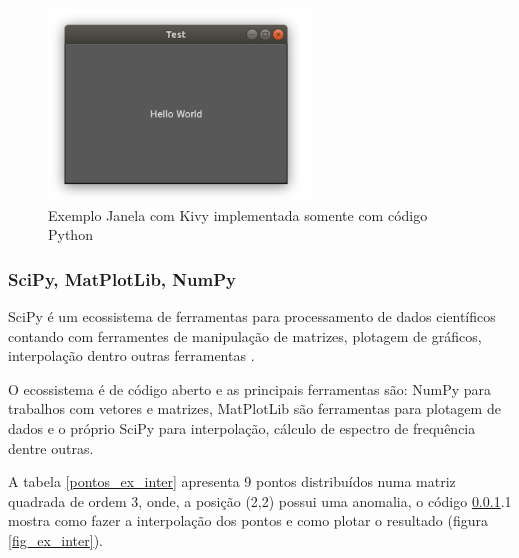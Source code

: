             \begin{figure}[h]
                \caption{Exemplo Janela com Kivy implementada somente com código Python}
                \begin{center}
                    \includegraphics[width=7cm]{texto/fig/hello_world_kivy.png} 
                \end{center}
                \label{janela_kivy} 
            \end{figure}


            
            \subsubsection{SciPy, MatPlotLib, NumPy}
            \label{lim_scipy}
            
            SciPy é um ecossistema de ferramentas para processamento de dados científicos contando com ferramentes de manipulação de matrizes, plotagem de gráficos, interpolação dentro outras ferramentas \cite{scipy}.
            
            O ecossistema é de código aberto e as principais ferramentas são: NumPy para trabalhos com vetores e matrizes, MatPlotLib são ferramentas para plotagem de dados e o próprio SciPy para interpolação, cálculo de espectro de frequência dentre outras.
            
            A tabela \ref{pontos_ex_inter} apresenta 9 pontos distribuídos numa matriz quadrada de ordem 3, onde, a posição (2,2) possui uma anomalia, o código \ref{lim_scipy}.1 mostra como fazer a interpolação dos pontos e como plotar o resultado (figura \ref{fig_ex_inter}).
            
